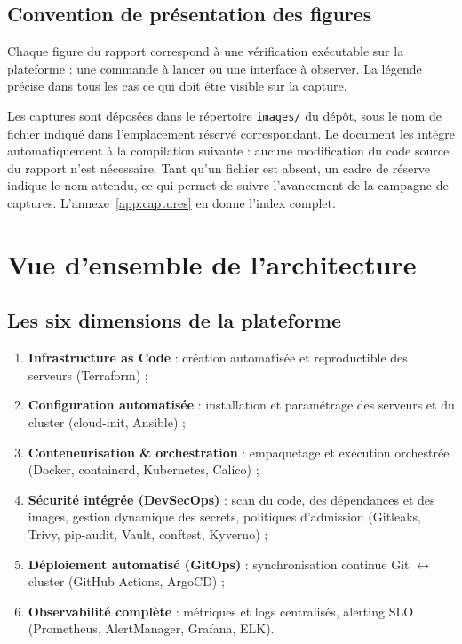 \documentclass[12pt,a4paper,twoside,openright]{report}
\begin{document}
\subsection{Convention de présentation des figures}
Chaque figure du rapport correspond à une vérification exécutable sur la plateforme :
une commande à lancer ou une interface à observer. La légende précise dans tous les cas
ce qui doit être visible sur la capture.

Les captures sont déposées dans le répertoire \texttt{images/} du dépôt, sous le nom de
fichier indiqué dans l'emplacement réservé correspondant. Le document les intègre
automatiquement à la compilation suivante : aucune modification du code source du
rapport n'est nécessaire. Tant qu'un fichier est absent, un cadre de réserve indique
le nom attendu, ce qui permet de suivre l'avancement de la campagne de captures.
L'annexe~\ref{app:captures} en donne l'index complet.

\section{Vue d'ensemble de l'architecture}

\subsection{Les six dimensions de la plateforme}

\begin{enumerate}[itemsep=2pt]
  \item \textbf{Infrastructure as Code} : création automatisée et reproductible des serveurs (Terraform) ;
  \item \textbf{Configuration automatisée} : installation et paramétrage des serveurs et du cluster (cloud-init, Ansible) ;
  \item \textbf{Conteneurisation \& orchestration} : empaquetage et exécution orchestrée (Docker, containerd, Kubernetes, Calico) ;
  \item \textbf{Sécurité intégrée (DevSecOps)} : scan du code, des dépendances et des images, gestion dynamique des secrets, politiques d'admission (Gitleaks, Trivy, pip-audit, Vault, conftest, Kyverno) ;
  \item \textbf{Déploiement automatisé (GitOps)} : synchronisation continue Git $\leftrightarrow$ cluster (GitHub Actions, ArgoCD) ;
  \item \textbf{Observabilité complète} : métriques et logs centralisés, alerting SLO (Prometheus, AlertManager, Grafana, ELK).
\end{enumerate}
\end{document}
